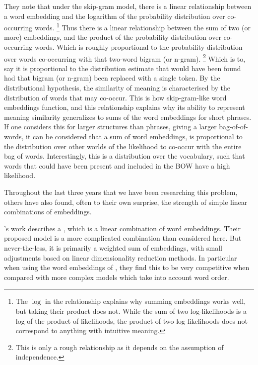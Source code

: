 \documentclass{book}
\begin{document}
They note that under the skip-gram model,
there is a linear relationship between a word embedding and the logarithm of the probability distribution over co-occurring words.%
\footnote{The $\log$ in the relationship explains why summing embeddings works well, but taking their product does not. While the sum of two log-likelihoods is a log of the product of likelihoods, the product of two log likelihoods does not correspond to anything with intuitive meaning.}
Thus there is a linear relationship between the sum of two (or more) embeddings,
and the product of the probability distribution over co-occurring words.
Which is roughly proportional to the probability distribution over words co-occurring with that two-word bigram (or n-gram).%
\footnote{This is only a rough relationship as it depends on the assumption of independence.}
Which is to, say it is proportional to the distribution estimate that would have been found had that bigram (or n-gram) been replaced with a single token.
By the distributional hypothesis, the similarity of meaning is characterised by the distribution of words that may co-occur.
This is how skip-gram-like word embeddings function, and this relationship explains why its ability to represent meaning similarity generalizes to sums of the word embeddings for short phrases.
If one considers this for larger structures than phrases, giving a larger bag-of-of-words,
it can be considered that a sum of word embeddings,
is proportional to the distribution over other worlds of the likelihood to co-occur with the entire bag of words.
Interestingly, this is a distribution over the vocabulary, such that words that could have been present and included in the BOW have a high likelihood.




Throughout the last three years that we have been researching this problem,
others have also found, often to their own surprise,
the strength of simple linear combinations of embeddings.

\citet{arora2016simple}'s work describes a ,
which is a linear combination of word embeddings.
Their proposed model is a more complicated combination than considered here.
But never-the-less, it is primarily a weighted sum of embeddings, with small adjustments based on linear dimensionality reduction methods.
In particular when using the word embeddings of \citet{wieting2015towards}, they find this to be very competitive when compared with more complex models which take into account word order.
\end{document}
